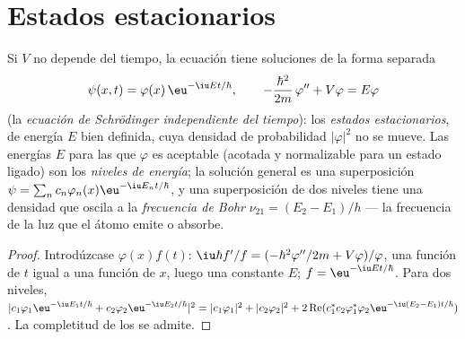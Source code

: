 \section{Estados estacionarios}

\begin{theorem}\label{thm:b2:schrodinger-wave-functions:stationary}
Si $V$ no depende del tiempo, la ecuación tiene soluciones de la
forma separada
\[
\psi(x,t) = \varphi(x)\,\eu^{-\iu Et/\hbar}, \qquad
-\frac{\hbar^2}{2m}\,\varphi'' + V\varphi = E\varphi
\]
(la \emph{ecuación de Schrödinger independiente del tiempo}): los \emph{estados
estacionarios}, de energía $E$ bien definida, cuya densidad
de probabilidad $|\varphi|^2$ no se mueve. Las energías $E$ para las que $\varphi$ es
aceptable (acotada y normalizable para un estado ligado) son los
\emph{niveles de energía}; la solución general es una superposición $\psi =
\sum_nc_n\varphi_n(x)\eu^{-\iu E_nt/\hbar}$, y una superposición de dos niveles
tiene una densidad que oscila a la \emph{frecuencia de Bohr} $\nu_{21} = (E_2 - E_1)/h$ --- la frecuencia de la luz que el
átomo emite o absorbe.
\end{theorem}

\begin{proof}
Introdúzcase $\varphi(x)f(t)$: $\iu\hbar f'/f = (-\hbar^2\varphi''/2m + V\varphi)/\varphi$,
una función de $t$ igual a una función de $x$, luego una constante $E$; $f
= \eu^{-\iu Et/\hbar}$. Para dos niveles, $|c_1\varphi_1\eu^{-\iu E_1t/\hbar} +
c_2\varphi_2\eu^{-\iu E_2t/\hbar}|^2 = |c_1\varphi_1|^2 + |c_2\varphi_2|^2 +
2\operatorname{Re}(c_1^*c_2\varphi_1^*\varphi_2\eu^{-\iu(E_2 - E_1)t/\hbar})$.
La completitud de los  se admite.
\end{proof}


